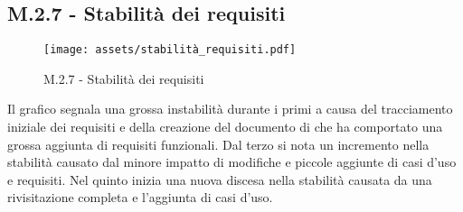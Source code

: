 \subsection{M.2.7 - Stabilità dei requisiti}
\begin{figure}[H]
    \centering
    \texttt{[image: assets/stabilità\_requisiti.pdf]}
    \caption{M.2.7 - Stabilità dei requisiti}
\end{figure}

\par Il grafico segnala una grossa instabilità durante i primi  a causa del tracciamento iniziale dei requisiti e della creazione del documento di \AdR che ha comportato una grossa aggiunta di requisiti funzionali. Dal terzo  si nota un incremento nella stabilità causato dal minore impatto di modifiche e piccole aggiunte di casi d'uso e requisiti. Nel quinto  inizia una nuova discesa nella stabilità causata da una rivisitazione completa e l'aggiunta di casi d'uso.